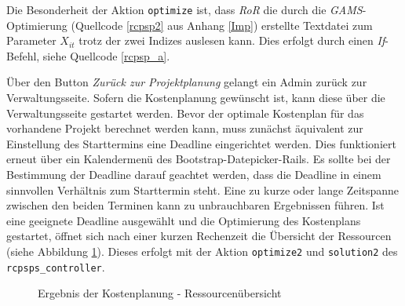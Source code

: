 \documentclass[a4paper,12pt,parskip,bibtotoc,liststotoc]{article}
\begin{document}
Die Besonderheit der Aktion \texttt{optimize} ist, dass \textit{RoR} die durch die \textit{GAMS}-Optimierung (Quellcode \ref{rcpsp2} aus Anhang \ref{Imp}) erstellte Textdatei zum Parameter $X_{it}$ trotz der zwei Indizes auslesen kann. Dies erfolgt durch einen \textit{If}-Befehl, siehe Quellcode \ref{rcpsp_a}. %



Über den Button \textit{Zurück zur Projektplanung} gelangt ein Admin zurück zur Verwaltungsseite. Sofern die Kostenplanung gewünscht ist, kann diese über die Verwaltungsseite gestartet werden. Bevor der optimale Kostenplan für das vorhandene Projekt berechnet werden kann, muss zunächst äquivalent zur Einstellung des Starttermins eine Deadline eingerichtet werden. Dies funktioniert erneut über ein Kalendermenü des \glqq Bootstrap-Datepicker-Rails\grqq. Es sollte bei der Bestimmung der Deadline darauf geachtet werden, dass die Deadline in einem sinnvollen Verhältnis zum Starttermin steht. Eine zu kurze oder lange Zeitspanne zwischen den beiden Terminen kann zu unbrauchbaren Ergebnissen führen. Ist eine geeignete Deadline ausgewählt und die Optimierung des Kostenplans gestartet, öffnet sich nach einer kurzen Rechenzeit die Übersicht der Ressourcen (siehe Abbildung \ref{ResKo}). Dieses erfolgt mit der Aktion \texttt{optimize2} und \texttt{solution2} des \texttt{rcpsps\_controller}.\\

\begin{figure}[h!]
  \begin{center}
    \caption{Ergebnis der Kostenplanung - Ressourcenübersicht}  \label{ResKo}
  \end{center}
\end{figure}
\end{document}
